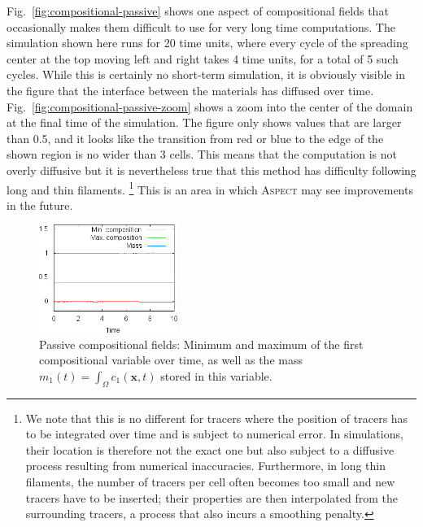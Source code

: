 \documentclass{article}
\newcommand{\aspect}{\textsc{Aspect}}
\begin{document}
Fig.~\ref{fig:compositional-passive} shows one aspect of compositional
fields that occasionally makes them difficult to use for very long
time computations. The simulation shown here runs for 20 time units,
where every cycle of the spreading center at the top moving left and
right takes 4 time units, for a total of 5 such cycles. While this is
certainly no short-term simulation, it is obviously visible in the
figure that the interface between the materials has diffused over
time. Fig.~\ref{fig:compositional-passive-zoom} shows a zoom into the
center of the domain at the final time of the simulation. The
figure only shows values that are larger than 0.5, and it looks like
the transition from red or blue to the edge of the shown region is no
wider than 3 cells. This means that the computation is not overly
diffusive but it is nevertheless true that this method has difficulty
following long and thin filaments.%
\footnote{We note that this is no different for tracers where the
  position of tracers has to be integrated over time and is subject to
  numerical error. In simulations, their location is therefore not the
  exact one but also subject to a diffusive process resulting from
  numerical inaccuracies. Furthermore, in long thin filaments, the
  number of tracers per cell often becomes too small and new tracers
  have to be inserted; their properties are then interpolated from the
  surrounding tracers, a process that also incurs a smoothing penalty.}
This is an area in which \aspect{} may see improvements in the future.


\begin{figure}
  \centering
  \includegraphics[width=0.4\textwidth]{cookbooks/composition-passive/mass-composition-1.png}
  \caption{Passive compositional fields: Minimum and maximum of the first compositional variable
   over time, as well as the mass $m_1(t)=\int_\Omega c_1(\mathbf x,t)$ stored in this variable.}
  \label{fig:compositional-passive-mass}
\end{figure}
\end{document}

